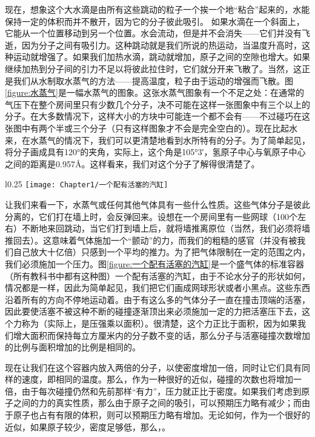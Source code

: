 现在，想象这个大水滴是由所有这些跳动的粒子一个挨一个地“粘合”起来的，水能保持一定的体积而并不散开，因为它的分子彼此吸引。 如果水滴在一个斜面上，它能从一个位置移动到另一个位置。水会流动，但是并不会消失——它们并没有飞逝，因为分子之间有吸引力。这种跳动就是我们所说的热运动，当温度升高时，这种运动就增强了。如果我们加热水滴，跳动就增加，原子之间的空隙也增大。如果继续加热到分子间的引力不足以将彼此拉住时，它们就分开来飞散了。当然，这正是我们从水制取水蒸气的方法——提高温度，粒子由于运动的增强而飞散。图\ref{figure:水蒸气}是一幅水蒸气的图象。这张水蒸气图象有一个不足之处：在通常的气压下在整个房间里只有少数几个分子，决不可能在这样一张图象中有三个以上的分子。在大多数情况下，这样大小的方块中可能连一个都不会有——不过碰巧在这张图中有两个半或三个分子（只有这样图象才不会是完全空白的）。现在比起水来，在水蒸气的情况下，我们可以更清楚地看到水所特有的分子。为了简单起见，将分子画成具有120°的夹角，实际上，这个角是105°3′，氢原子中心与氧原子中心之间的距离是0.957Å。这样看来，我们对这个分子了解得很清楚了。

\begin{wrapfigure}{l}{0.25\textwidth}
    \centering
    \texttt{[image: Chapter1/一个配有活塞的汽缸]}
    \caption{汽缸}
    \label{figure:一个配有活塞的汽缸}
\end{wrapfigure}
让我们来看一下，水蒸气或任何其他气体具有一些什么性质。这些气体分子是彼此分离的，它们打在墙上时，会反弹回来。设想在一个房间里有一些网球（100个左右）不断地来回跳动，当它们打到墙上后，就将墙推离原位（当然，我们必须将墙推回去）。这意味着气体施加一个“颤动”的力，而我们的粗糙的感官（并没有被我们自己放大十亿倍）只感到一个平均的推力。为了把气体限制在一定的范围之内，我们必须施加一个压力。图\ref{figure:一个配有活塞的汽缸}是一个盛气体的标准容器（所有教科书中都有这种图）一个配有活塞的汽缸，由于不论水分子的形状如何，情况都是一样，因此为简单起见，我们把它们画成网球形状或者小黑点。这些东西沿着所有的方向不停地运动着。由于有这么多的气体分子一直在撞击顶端的活塞，因此要使活塞不被这种不断的碰撞逐渐顶出来必须施加一定的力把活塞压下去，这个力称为（实际上，是压强乘以面积）。很清楚，这个力正比于面积，因为如果我们增大面积而保持每立方厘米内的分子数不变的话，那么分子与活塞碰撞次数增加的比例与面积增加的比例是相同的。

现在让我们在这个容器内放入两倍的分子，以使密度增加一倍，同时让它们具有同样的速度，即相同的温度。那么，作为一种很好的近似，碰撞的次数也将增加一倍，由于每次碰撞仍然和先前那样“有力”，压力就正比于密度。如果我们考虑到原子之间的力的真实性质，那么由于原子之间的吸引，可以预期压力略有减少；而由于原子也占有有限的体积，则可以预期压力略有增加。无论如何，作为一个很好的近似，如果原子较少，密度足够低，那么，。

